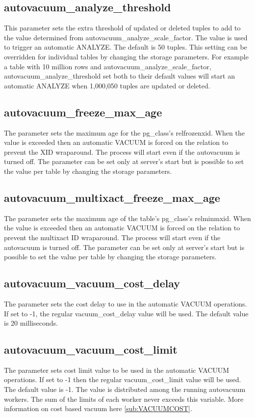 \subsection{autovacuum\_analyze\_threshold}
This parameter sets the extra threshold of updated or deleted tuples to add to the value determined from 
autovacuum\_analyze\_scale\_factor. The value is used to  trigger an automatic ANALYZE. The default is 50 
tuples. This setting can be overridden for individual tables by changing the storage parameters. For 
example a 
table with 10 million rows and autovacuum\_analyze\_scale\_factor, autovacuum\_analyze\_threshold set both 
to their default values will start an automatic ANALYZE when 1,000,050 tuples are updated or deleted.

\subsection{autovacuum\_freeze\_max\_age}
The parameter sets the maximum age for the pg\_class's relfrozenxid. When the value is exceeded then an 
automatic VACUUM is forced on the relation to prevent the XID wraparound. The process will start 
even if the autovacuum is turned off. The parameter can be set only at server's start but is possible to 
set the value per table by changing the storage parameters.

\subsection{autovacuum\_multixact\_freeze\_max\_age}
The parameter sets the maximum age of the table's pg\_class's relminmxid. When the value is exceeded then 
an automatic VACUUM is forced on the relation to prevent the  multixact ID wraparound. The process will 
start even if the autovacuum is turned off. The parameter can be set only at server's start but is possible 
to set the value per table by changing the storage parameters.

\subsection{autovacuum\_vacuum\_cost\_delay}
The parameter sets the cost delay to use in the automatic VACUUM operations. If set to -1, the regular 
vacuum\_cost\_delay value will be used. The default value is 20 milliseconds. 

\subsection{autovacuum\_vacuum\_cost\_limit}
The parameter sets  cost limit value to be used in the automatic VACUUM operations. If set to -1 then the 
regular vacuum\_cost\_limit value will be used. The default value is -1. The value is distributed among the 
running autovacuum workers. The sum of the limits of each worker never exceeds this variable. More 
information on cost based vacuum here \ref{sub:VACUUMCOST}.



